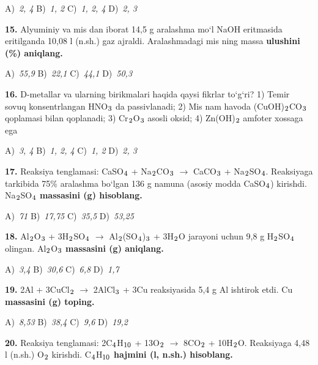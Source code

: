 \documentclass[11pt,a4paper]{article}
\renewcommand{\textsubscript}[1]{\ensuremath{_{\text{\fontsize{8}{8}\selectfont #1}}}}
\begin{document}
\begin{multicols}{2}
\noindent A)~\textsl{2, 4} \hfill B)~\textsl{1, 2} \hfill C)~\textsl{1, 2, 4} \hfill D)~\textsl{2, 3}\par
\vspace{4pt}
\noindent\textbf{15.} Alyuminiy va mis dan iborat 14,5 g aralashma mo`l NaOH eritmasida eritilganda 10,08 l (n.sh.) gaz ajraldi. Aralashmadagi mis ning massa \textbf{ulushini (\%) aniqlang.}

\noindent A)~\textsl{55,9} \hfill B)~\textsl{22,1} \hfill C)~\textsl{44,1} \hfill D)~\textsl{50,3}\par
\vspace{4pt}
\noindent\textbf{16.} D-metallar va ularning birikmalari haqida qaysi fikrlar to`g`ri? 1) Temir sovuq konsentrlangan HNO\textsubscript{3} da passivlanadi; 2) Mis nam havoda (CuOH)\textsubscript{2}CO\textsubscript{3} qoplamasi bilan qoplanadi; 3) Cr\textsubscript{2}O\textsubscript{3} asosli oksid; 4) Zn(OH)\textsubscript{2} amfoter xossaga ega

\noindent A)~\textsl{3, 4} \hfill B)~\textsl{1, 2, 4} \hfill C)~\textsl{1, 2} \hfill D)~\textsl{2, 3}\par
\vspace{4pt}
\noindent\textbf{17.} Reaksiya tenglamasi: CaSO\textsubscript{4} + Na\textsubscript{2}CO\textsubscript{3} $\to$ CaCO\textsubscript{3} + Na\textsubscript{2}SO\textsubscript{4}. Reaksiyaga tarkibida 75\% aralashma bo`lgan 136 g namuna (asosiy modda CaSO\textsubscript{4}) kirishdi. Na\textsubscript{2}SO\textsubscript{4} \textbf{massasini (g) hisoblang.}

\noindent A)~\textsl{71} \hfill B)~\textsl{17,75} \hfill C)~\textsl{35,5} \hfill D)~\textsl{53,25}\par
\vspace{4pt}
\noindent\textbf{18.} Al\textsubscript{2}O\textsubscript{3} + 3H\textsubscript{2}SO\textsubscript{4} $\to$ Al\textsubscript{2}(SO\textsubscript{4})\textsubscript{3} + 3H\textsubscript{2}O jarayoni uchun 9,8 g H\textsubscript{2}SO\textsubscript{4} olingan. Al\textsubscript{2}O\textsubscript{3} \textbf{massasini (g) aniqlang.}

\noindent A)~\textsl{3,4} \hfill B)~\textsl{30,6} \hfill C)~\textsl{6,8} \hfill D)~\textsl{1,7}\par
\vspace{4pt}
\noindent\textbf{19.} 2Al + 3CuCl\textsubscript{2} $\to$ 2AlCl\textsubscript{3} + 3Cu reaksiyasida 5,4 g Al ishtirok etdi. Cu \textbf{massasini (g) toping.}

\noindent A)~\textsl{8,53} \hfill B)~\textsl{38,4} \hfill C)~\textsl{9,6} \hfill D)~\textsl{19,2}\par
\vspace{4pt}
\noindent\textbf{20.} Reaksiya tenglamasi: 2C\textsubscript{4}H\textsubscript{10} + 13O\textsubscript{2} $\to$ 8CO\textsubscript{2} + 10H\textsubscript{2}O. Reaksiyaga 4,48 l (n.sh.) O\textsubscript{2} kirishdi. C\textsubscript{4}H\textsubscript{10} \textbf{hajmini (l, n.sh.) hisoblang.}


\end{multicols}
\end{document}

